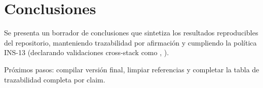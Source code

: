 \chapter{Conclusiones}

Se presenta un borrador de conclusiones que sintetiza los resultados reproducibles del repositorio, manteniendo trazabilidad por afirmación y cumpliendo la política INS-13 (declarando validaciones cross-stack como , ).

Próximos pasos: compilar versión final, limpiar referencias y completar la tabla de trazabilidad completa por claim.
